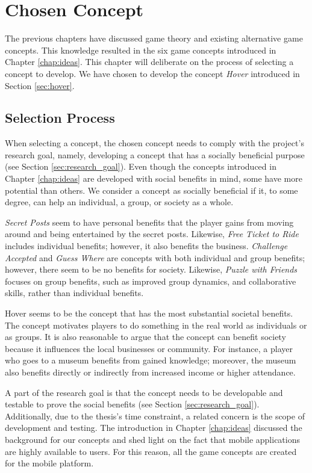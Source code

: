 \documentclass[../Main.tex]{subfiles}
\begin{document}
\section{Chosen Concept}
\label{chap:chosen_concept}
The previous chapters have discussed game theory and existing alternative game concepts. This knowledge resulted in the six game concepts introduced in Chapter \ref{chap:ideas}. This chapter will deliberate on the process of selecting a concept to develop. We have chosen to develop the concept \textit{Hover} introduced in Section \ref{sec:hover}.

\subsection{Selection Process}
When selecting a concept, the chosen concept needs to comply with the project’s research goal, namely, developing a concept that has a socially beneficial purpose (see Section \ref{sec:research_goal}). Even though the concepts introduced in Chapter \ref{chap:ideas} are developed with social benefits in mind, some have more potential than others. We consider a concept as socially beneficial if it, to some degree, can help an individual, a group, or society as a whole. 

\textit{Secret Posts} seem to have personal benefits that the player gains from moving around and being entertained by the secret posts. Likewise, \textit{Free Ticket to Ride} includes individual benefits; however, it also benefits the business. \textit{Challenge Accepted} and \textit{Guess Where} are concepts with both individual and group benefits; however, there seem to be no benefits for society. Likewise, \textit{Puzzle with Friends} focuses on group benefits, such as improved group dynamics, and collaborative skills, rather than individual benefits.  

Hover seems to be the concept that has the most substantial societal benefits. The concept motivates players to do something in the real world as individuals or as groups. It is also reasonable to argue that the concept can benefit society because it influences the local businesses or community. For instance, a player who goes to a museum benefits from gained knowledge; moreover, the museum also benefits directly or indirectly from increased income or higher attendance.

A part of the research goal is that the concept needs to be developable and testable to prove the social benefits (see Section \ref{sec:research_goal}). Additionally, due to the thesis’s time constraint, a related concern is the scope of development and testing. The introduction in Chapter \ref{chap:ideas} discussed the background for our concepts and shed light on the fact that mobile applications are highly available to users. For this reason, all the game concepts are created for the mobile platform. 
\end{document}
